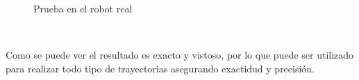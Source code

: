 \begin{figure} [ht!]
    \centering  
    \hspace{1cm}
    \caption{Prueba en el robot real}
    \label{fig:real_draw}
\end{figure}\ 

Como se puede ver el resultado es exacto y vistoso, por lo que puede ser utilizado para realizar todo tipo de trayectorias asegurando exactidud y precisión.
